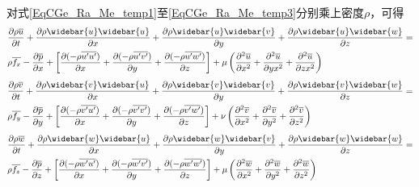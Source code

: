 对式\eqref{EqCGe_Ra_Me_temp1}至\eqref{EqCGe_Ra_Me_temp3}分别乘上密度$\rho$，可得
\begin{equation}
  \begin{aligned}
    &\frac{\partial \rho\overline{u}}{\partial t} +
    \frac{\partial \rho\widebar{u}\widebar{u}}{\partial x} +
    \frac{\partial \rho\widebar{u}\widebar{v}}{\partial y} +
    \frac{\partial \rho\widebar{u}\widebar{w}}{\partial z}
    = \\
    &\rho \overline{f_{x}}
    -\frac{\partial \overline{p}}{\partial x} +
    \left[
      \frac{\partial (-\rho\overline{u^{\prime}u^{\prime}})}{\partial x} +
      \frac{\partial (-\rho\overline{u^{\prime}v^{\prime}})}{\partial y} +
      \frac{\partial (-\rho\overline{u^{\prime}w^{\prime}})}{\partial z}
    \right]
    +
    \mu
    \left(
    \frac{\partial^{2} \overline{u}}{\partial x^{2}} +
    \frac{\partial^{2} \overline{u}}{\partial y x^{2}} +
    \frac{\partial^{2} \overline{u}}{\partial z x^{2}}
    \right)
    \label{EqCGe_Ra_Me_1}
  \end{aligned}
\end{equation}
\begin{equation}
  \begin{aligned}
    &\frac{\partial \rho\overline{v}}{\partial t} +
    \frac{\partial \rho\widebar{v}\widebar{u}}{\partial x} +
    \frac{\partial \rho\widebar{v}\widebar{v}}{\partial y} +
    \frac{\partial \rho\widebar{v}\widebar{w}}{\partial z}
    = \\
    &\rho \overline{f_{y}}
    -\frac{\partial \overline{p}}{\partial y} +
    \left[
      \frac{\partial (-\rho\overline{v^{\prime}u^{\prime}})}{\partial x} +
      \frac{\partial (-\rho\overline{v^{\prime}v^{\prime}})}{\partial y} +
      \frac{\partial (-\rho\overline{v^{\prime}w^{\prime}})}{\partial z}
    \right]
    +
    \nu
    \left(
    \frac{\partial^{2} \overline{v}}{\partial x^{2}} +
    \frac{\partial^{2} \overline{v}}{\partial y^{2}} +
    \frac{\partial^{2} \overline{v}}{\partial z^{2}}
    \right)
    \label{EqCGe_Ra_Me_2}
  \end{aligned}
\end{equation}
\begin{equation}
  \begin{aligned}
    &\frac{\partial \rho\overline{w}}{\partial t} +
    \frac{\partial \rho\widebar{w}\widebar{u}}{\partial x} +
    \frac{\partial \rho\widebar{w}\widebar{v}}{\partial y} +
    \frac{\partial \rho\widebar{w}\widebar{w}}{\partial z}
    = \\
    &\rho \overline{f_{z}}
    -\frac{\partial \overline{p}}{\partial z} +
    \left[
      \frac{\partial (-\rho\overline{w^{\prime}u^{\prime}})}{\partial x} +
      \frac{\partial (-\rho\overline{w^{\prime}v^{\prime}})}{\partial y} +
      \frac{\partial (-\rho\overline{w^{\prime}w^{\prime}})}{\partial z}
    \right]
    +
    \mu
    \left(
    \frac{\partial^{2} \overline{w}}{\partial x^{2}} +
    \frac{\partial^{2} \overline{w}}{\partial y^{2}} +
    \frac{\partial^{2} \overline{w}}{\partial z^{2}}
    \right)
    \label{EqCGe_Ra_Me_3}
  \end{aligned}
\end{equation}
